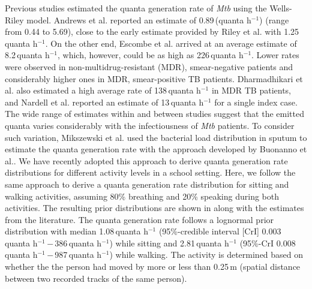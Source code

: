 \documentclass[fleqn,11pt]{wlscirep_supp}
\begin{document}
Previous studies estimated the quanta generation rate of \emph{Mtb} using the Wells-Riley model\cite{Andrews2014JID,Riley1962ARRD,Escombe2008PLoSMed,Nardell1991ARRD,Dharmadhikari2012AJRCCM}. Andrews et al.\cite{Andrews2014JID} reported an estimate of 0.89\,(quanta h$^{-1}$) (range from 0.44 to 5.69), close to the early estimate provided by Riley et al.\cite{Riley1962ARRD} with 1.25\,quanta h$^{-1}$. On the other end, Escombe et al.\cite{Escombe2008PLoSMed} arrived at an average estimate of 8.2\,quanta h$^{-1}$, which, however, could be as high as 226\,quanta h$^{-1}$. Lower rates were observed in non-multidrug-resistant (MDR), smear-negative patients and considerably higher ones in MDR, smear-positive TB patients\cite{Escombe2008PLoSMed}. Dharmadhikari et al.\cite{Dharmadhikari2012AJRCCM} also estimated a high average rate of 138\,quanta h$^{-1}$ in MDR TB patients, and Nardell et al.\cite{Nardell1991ARRD} reported an estimate of 13\,quanta h$^{-1}$ for a single index case. The wide range of estimates within and between studies suggest that the emitted quanta varies considerably with the infectiousness of \emph{Mtb} patients\cite{Wurie2016BMJ}. To consider such variation, Mikszewski et al.\cite{Mikszewski2021GF} used the bacterial load distribution in sputum to estimate the quanta generation rate with the approach developed by Buonanno et al.\cite{Buonanno2020EI}. We have recently adopted this approach to derive quanta generation rate distributions for different activity levels in a school setting\cite{Banholzer2024PGPH}. Here, we follow the same approach to derive a quanta generation rate distribution for sitting and walking activities, assuming 80\% breathing and 20\% speaking during both activities. The resulting prior distributions are shown in  along with the estimates from the literature. The quanta generation rate follows a lognormal prior distribution with median 1.08\,quanta h$^{-1}$ (95\%-credible interval [CrI] 0.003\,quanta h$^{-1}$\,$-$\,386\,quanta h$^{-1}$) while sitting and 2.81\,quanta h$^{-1}$ (95\%-CrI 0.008\,quanta h$^{-1}$\,$-$\,987\,quanta h$^{-1}$) while walking. The activity is determined based on whether the the person had moved by more or less than 0.25\,m (spatial distance between two recorded tracks of the same person). 
\end{document}
